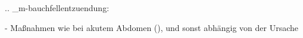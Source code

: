%

.. _m-bauchfellentzuendung:

\begin{itemize}
  -   Maßnahmen wie bei akutem Abdomen
  (), und sonst abhängig von
  der Ursache
\end{itemize}